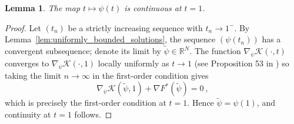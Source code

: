 \documentclass{scrartcl}
\newcommand{\red}[1]{\textcolor{red}{#1}}
\newcommand{\R}{{\mathbb R}}
\theoremstyle{plain}
\newtheorem{lem}[thm]{Lemma}
\theoremstyle{definition}
\begin{document}
\begin{lem} \label{lem:limit_psi_at_1}
    The map $t\mapsto\psi(t)$ is continuous at $t=1$.
\end{lem}
\begin{proof}
    Let $(t_n)$ be a strictly increasing sequence with $t_n\to 1^-$. By Lemma~\ref{lem:uniformly_bounded_solutions}, the sequence $(\psi(t_n))$ has a convergent subsequence; denote its limit by $\widetilde{\psi}\in\R^N$. The function $\nabla_\psi\mathcal{K}(\cdot,t)$ converges to $\nabla_\psi\mathcal{K}(\cdot,1)$ locally uniformly as $t\to 1$ (see Proposition 53 in \cite{MerigotThibert2021})%
    so taking the limit $n\to\infty$ in the first-order condition gives
    \[
        \nabla_\psi\mathcal{K}(\widetilde{\psi},1) + \nabla F^*(\widetilde{\psi})=0\ ,
    \]
    which is precisely the first-order condition at $t=1$. Hence $\widetilde{\psi}=\psi(1)$, and continuity at $t=1$ follows.
\end{proof}
\end{document}
